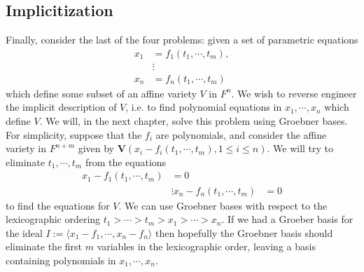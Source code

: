 \documentclass{article}
\begin{document}
\subsection{Implicitization}
Finally, consider the last of the four problems: given a set of parametric equations
$$ \begin{aligned}
	x_1 &= f_1(t_1, \cdots, t_m), \\
	& \vdots \\
	x_n &= f_n(t_1, \cdots, t_m)
\end{aligned} $$
which define some subset of an affine variety $ V $ in $ F^n $. We wish to reverse engineer the implicit description of $ V $, i.e. to find polynomial equations in $ x_1, \cdots, x_n $ which define $ V $. We will, in the next chapter, solve this problem using Groebner bases. For simplicity, suppose that the $ f_i $ are polynomials, and consider the affine variety in $ F^{n + m} $ given by $ \mathbf{V}(x_i - f_i(t_1, \cdots, t_m), 1 \leq i \leq n) $. We will try to eliminate $ t_1, \cdots, t_m $ from the equations
$$ \begin{aligned}
	x_1 - f_1(t_1, \cdots, t_m) &= 0 \\
	& \vdots
	x_n - f_n(t_1, \cdots, t_m) &= 0
\end{aligned} $$
to find the equations for $ V $. We can use Groebner bases with respect to the lexicographic ordering $ t_1 > \cdots > t_m > x_1 > \cdots > x_n $. If we had a Groeber basis for the ideal $ I := \langle x_1 - f_1, \cdots, x_n - f_n \rangle $ then hopefully the Groebner basis should eliminate the first $ m $ variables in the lexicographic order, leaving a basis containing polynomials in $ x_1, \cdots, x_n $.
\end{document}
